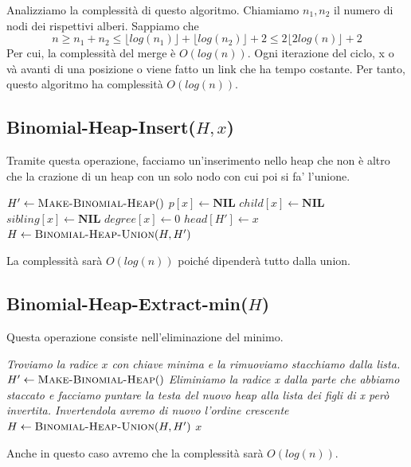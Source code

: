 Analizziamo la complessità di questo algoritmo. Chiamiamo $n_1, n_2$ il numero di nodi dei rispettivi alberi. Sappiamo che \[n\geq n_1+n_2\leq \lfloor log(n_1) \rfloor + \lfloor log(n_2) \rfloor+2\leq 2 \lfloor 2log(n) \rfloor+2\] Per cui, la complessità del merge è $O(log(n))$. Ogni iterazione del ciclo, x o và avanti di una posizione o viene fatto un link che ha tempo 
costante. Per tanto, questo algoritmo ha complessità $O(log(n)).$

\subsection{Binomial-Heap-Insert($H,x$)}
Tramite questa operazione, facciamo un'inserimento nello heap che non è altro che la crazione di un heap con un solo nodo con cui poi si fa' l'unione.
\begin{algorithm}[H]
\caption{BINOMIAL-HEAP-INSERT($H$, $x$)}
\begin{algorithmic}[1]
    \State $H' \gets \textsc{Make-Binomial-Heap}()$
    \State $p[x] \gets \textbf{NIL}$
    \State $child[x] \gets \textbf{NIL}$
    \State $sibling[x] \gets \textbf{NIL}$
    \State $degree[x] \gets 0$
    \State $head[H'] \gets x$
    \State $H \gets \textsc{Binomial-Heap-Union}(H, H')$
\end{algorithmic}
\end{algorithm}
La complessità sarà $O(log(n))$ poiché dipenderà tutto dalla union.

\subsection{Binomial-Heap-Extract-min($H$)}
Questa operazione consiste nell'eliminazione del minimo.
\begin{algorithm}[H]
\caption{BINOMIAL-HEAP-EXTRACT-MIN($H$)}
\begin{algorithmic}[1]
    \State \textit{Troviamo la radice $x$ con chiave minima e la rimuoviamo stacchiamo dalla lista.}
    \State $H' \gets \textsc{Make-Binomial-Heap}()$
    \State \textit{Eliminiamo la radice x dalla parte che abbiamo staccato e facciamo puntare la testa del nuovo heap alla lista dei figli di x però invertita. Invertendola avremo di nuovo l'ordine crescente}
    \State $H \gets \textsc{Binomial-Heap-Union}(H, H')$ 
    \State \Return $x$
\end{algorithmic}
\end{algorithm}
Anche in questo caso avremo che la complessità sarà $O(log(n))$.

